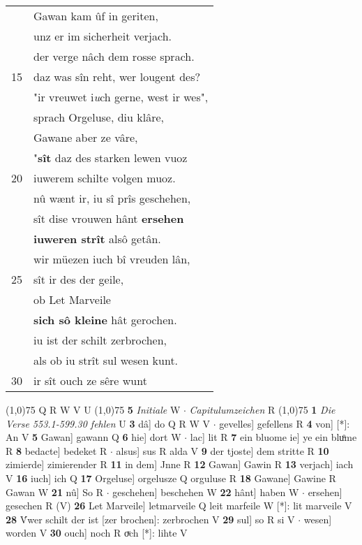 \documentclass[8pt,a4paper,notitlepage]{article}
\begin{document}
\begin{table}[ht]
\begin{minipage}[t]{0.5\linewidth}
\begin{tabular}{rl}
 & Gawan kam ûf in geriten,\\ 
 & unz er im sicherheit verjach.\\ 
 & der verge nâch dem rosse sprach.\\ 
15 & daz was sîn reht, wer lougent des?\\ 
 & "ir vreuwet i\textit{u}ch gerne, west ir wes",\\ 
 & sprach Orgeluse, diu klâre,\\ 
 & Gawane aber ze vâre,\\ 
 & "\textbf{sît} daz des starken lewen vuoz\\ 
20 & iuwerem schilte volgen muoz.\\ 
 & nû wænt ir, iu sî prîs geschehen,\\ 
 & sît dise vrouwen hânt \textbf{ersehen}\\ 
 & \textbf{iuweren strît} alsô getân.\\ 
 & wir müezen iuch bî vreuden lân,\\ 
25 & sît ir des der geile,\\ 
 & ob Let Marveile\\ 
 & \textbf{sich sô kleine} hât gerochen.\\ 
 & iu ist der schilt zerbrochen,\\ 
 & als ob iu strît sul wesen kunt.\\ 
30 & ir sît ouch ze sêre wunt\\ 
\end{tabular}
\scriptsize
\line(1,0){75} \newline
Q R W V U \newline
\line(1,0){75} \newline
\textbf{5} \textit{Initiale} W   $\cdot$ \textit{Capitulumzeichen} R  \newline
\line(1,0){75} \newline
\textbf{1} \textit{Die Verse 553.1-599.30 fehlen} U  \textbf{3} dâ] do Q R W V  $\cdot$ gevelles] gefellens R \textbf{4} von] [*]: An V \textbf{5} Gawan] gawann Q \textbf{6} hie] dort W  $\cdot$ lac] lit R \textbf{7} ein bluome ie] ye ein bluͦme R \textbf{8} bedacte] bedeket R  $\cdot$ alsus] sus R alda V \textbf{9} der tjoste] dem stritte R \textbf{10} zimierde] zimierender R \textbf{11} in dem] Jnne R \textbf{12} Gawan] Gawin R \textbf{13} verjach] iach V \textbf{16} iuch] ich Q \textbf{17} Orgeluse] orgelusze Q orguluse R \textbf{18} Gawane] Gawine R Gawan W \textbf{21} nû] So R  $\cdot$ geschehen] beschehen W \textbf{22} hânt] haben W  $\cdot$ ersehen] gesechen R (V) \textbf{26} Let Marveile] letmarveile Q leit marfeile W [*]: lit marveile V \textbf{28} V́wer schilt der ist [zer brochen]: zerbrochen V \textbf{29} sul] so R si V  $\cdot$ wesen] worden V \textbf{30} ouch] noch R oͮch [*]: lihte V \newline
\end{minipage}
\end{table}
\end{document}
